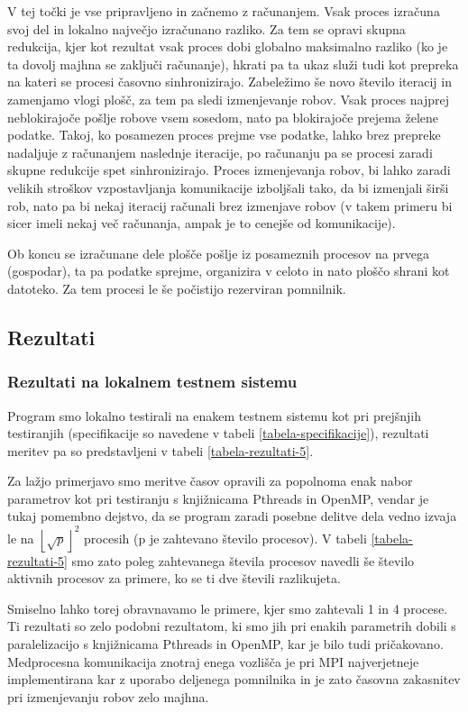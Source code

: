 \documentclass[a4paper,titlepage,11pt]{article}
\begin{document}
V tej točki je vse pripravljeno in začnemo z računanjem. Vsak proces izračuna svoj del in lokalno največjo izračunano razliko. Za tem se opravi skupna redukcija, kjer kot rezultat vsak proces dobi globalno maksimalno razliko (ko je ta dovolj majhna se zaključi računanje), hkrati pa ta ukaz služi tudi kot prepreka na kateri se procesi časovno sinhronizirajo. Zabeležimo še novo število iteracij in zamenjamo vlogi plošč, za tem pa sledi izmenjevanje robov. Vsak proces najprej neblokirajoče pošlje robove vsem sosedom, nato pa blokirajoče prejema želene podatke. Takoj, ko posamezen proces prejme vse podatke, lahko brez prepreke nadaljuje z računanjem naslednje iteracije, po računanju pa se procesi zaradi skupne redukcije spet sinhronizirajo. Proces izmenjevanja robov, bi lahko zaradi velikih stroškov vzpostavljanja komunikacije izboljšali tako, da bi izmenjali širši rob, nato pa bi nekaj iteracij računali brez izmenjave robov (v takem primeru bi sicer imeli nekaj več računanja, ampak je to cenejše od komunikacije).

Ob koncu se izračunane dele plošče pošlje iz posameznih procesov na prvega (gospodar), ta pa podatke sprejme, organizira v celoto in nato ploščo shrani kot datoteko. Za tem procesi le še počistijo rezerviran pomnilnik.

\subsection{Rezultati}

\subsubsection{Rezultati na lokalnem testnem sistemu}

Program smo lokalno testirali na enakem testnem sistemu kot pri prejšnjih testiranjih (specifikacije so navedene v tabeli \ref{tabela-specifikacije}), rezultati meritev pa so predstavljeni v tabeli \ref{tabela-rezultati-5}.

Za lažjo primerjavo smo meritve časov opravili za popolnoma enak nabor parametrov kot pri testiranju s knjižnicama Pthreads in OpenMP, vendar je tukaj pomembno dejstvo, da se program zaradi posebne delitve dela vedno izvaja le na \(\left \lfloor{\sqrt{p}}\right \rfloor ^ 2\) procesih (p je zahtevano število procesov). V tabeli \ref{tabela-rezultati-5} smo zato poleg zahtevanega števila procesov navedli še število aktivnih procesov za primere, ko se ti dve števili razlikujeta.

Smiselno lahko torej obravnavamo le primere, kjer smo zahtevali 1 in 4 procese. Ti rezultati so zelo podobni rezultatom, ki smo jih pri enakih parametrih dobili s paralelizacijo s knjižnicama Pthreads in OpenMP, kar je bilo tudi pričakovano. Medprocesna komunikacija znotraj enega vozlišča je pri MPI najverjetneje implementirana kar z uporabo deljenega pomnilnika in je zato časovna zakasnitev pri izmenjevanju robov zelo majhna.
\end{document}
